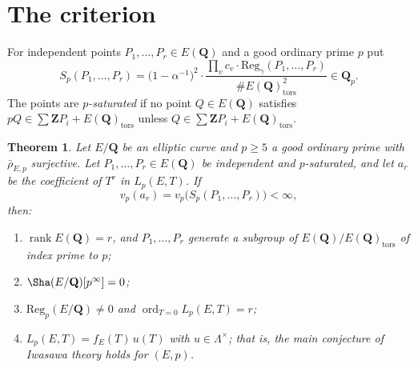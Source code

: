 \documentclass[11pt]{amsart}
\newtheorem{theorem}{Theorem}[section]
\theoremstyle{definition}
\newcommand{\Q}{\mathbf{Q}}
\newcommand{\Z}{\mathbf{Z}}
\newcommand{\Qp}{\mathbf{Q}_p}
\newcommand{\Reg}{\mathrm{Reg}}
\newcommand{\rk}{\operatorname{rank}}
\newcommand{\ord}{\operatorname{ord}}
\newcommand{\rhobar}{\bar\rho_{E,p}}
\newcommand{\tors}{\mathrm{tors}}
\begin{document}
\section{The criterion}\label{sec:criterion}

For independent points $P_1,\dots,P_r\in E(\Q)$ and a good ordinary prime $p$ put
\begin{equation}\label{eq:S}
S_p(P_1,\dots,P_r)=\bigl(1-\alpha^{-1}\bigr)^2\cdot\frac{\prod_vc_v\cdot\Reg_\gamma(P_1,\dots,P_r)}{\#E(\Q)_\tors^2}\in\Qp .
\end{equation}
The points are \emph{$p$-saturated} if no point $Q\in E(\Q)$ satisfies $pQ\in\sum\Z P_i+E(\Q)_\tors$ unless $Q\in\sum\Z P_i+E(\Q)_\tors$.

\begin{theorem}\label{thm:criterion}
Let $E/\Q$ be an elliptic curve and $p\ge5$ a good ordinary prime with $\rhobar$ surjective. Let $P_1,\dots,P_r\in E(\Q)$ be independent and $p$-saturated, and let $a_r$ be the coefficient of $T^r$ in $L_p(E,T)$. If
\begin{equation}\label{eq:test}
v_p(a_r)=v_p\bigl(S_p(P_1,\dots,P_r)\bigr)<\infty,
\end{equation}
then:
\begin{enumerate}
\item[(i)] $\rk E(\Q)=r$, and $P_1,\dots,P_r$ generate a subgroup of $E(\Q)/E(\Q)_\tors$ of index prime to $p$;
\item[(ii)] $\Sha(E/\Q)[p^\infty]=0$;
\item[(iii)] $\Reg_p(E/\Q)\ne0$ and $\ord_{T=0}L_p(E,T)=r$;
\item[(iv)] $L_p(E,T)=f_E(T)\,u(T)$ with $u\in\Lambda^\times$; that is, the main conjecture of Iwasawa theory holds for $(E,p)$.
\end{enumerate}
\end{theorem}
\end{document}
